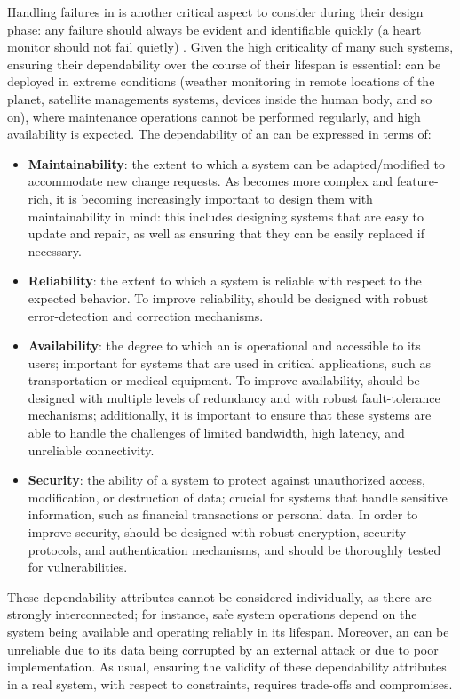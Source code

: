 Handling failures in \ess is another critical aspect to consider during their design phase: any failure should always be evident and identifiable quickly (a heart monitor should not fail quietly) \cite{MakingEmbeddedSystems}. Given the high criticality of many such systems, ensuring their dependability over the course of their lifespan is essential: \ess can be deployed in extreme conditions (\eg weather monitoring in remote locations of the planet, satellite managements systems, devices inside the human body, and so on), where maintenance operations cannot be performed regularly, and high availability is expected. 
The dependability of an \es can be expressed in terms of:
\begin{itemize}
    \item \textbf{Maintainability}: the extent to which a system can be adapted/modified to accommodate new change requests. As \ess becomes more complex and feature-rich, it is becoming increasingly important to design them with maintainability in mind: this includes designing systems that are easy to update and repair, as well as ensuring that they can be easily replaced if necessary.
    \item \textbf{Reliability}: the extent to which a system is reliable with respect to the expected behavior. To improve reliability, \es should be designed with robust error-detection and correction mechanisms.
    \item \textbf{Availability}: the degree to which an \es is operational and accessible to its users; important for systems that are used in critical applications, such as transportation or medical equipment. To improve availability, \ess should be designed with multiple levels of redundancy and with robust fault-tolerance mechanisms; additionally, it is important to ensure that these systems are able to handle the challenges of limited bandwidth, high latency, and unreliable connectivity.
    \item \textbf{Security}: the ability of a system to protect against unauthorized access, modification, or destruction of data; crucial for systems that handle sensitive information, such as financial transactions or personal data. In order to improve security, \ess should be designed with robust encryption, security protocols, and authentication mechanisms, and should be thoroughly tested for vulnerabilities.
\end{itemize}

These dependability attributes cannot be considered individually, as there are strongly interconnected; for instance, safe system operations depend on the system being available and operating reliably in its lifespan. Moreover, an \es can be unreliable due to its data being corrupted by an external attack or due to poor implementation. As usual, ensuring the validity of these dependability attributes in a real system, with respect to \es constraints, requires trade-offs and compromises.





